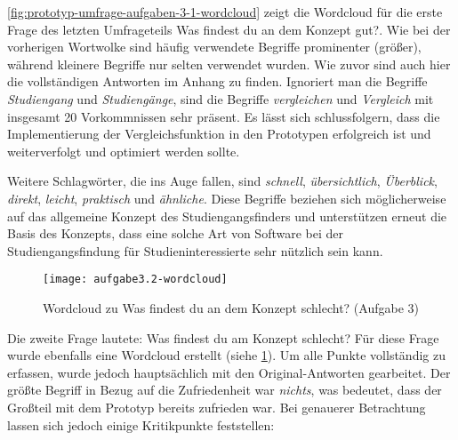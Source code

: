 \autoref{fig:prototyp-umfrage-aufgaben-3-1-wordcloud} zeigt die Wordcloud für die erste Frage des letzten Umfrageteils \glqq Was findest du an dem Konzept gut?\grqq{}. Wie bei der vorherigen Wortwolke sind häufig verwendete Begriffe prominenter (größer), während kleinere Begriffe nur selten verwendet wurden. Wie zuvor sind auch hier die vollständigen Antworten im Anhang zu finden. Ignoriert man die Begriffe \textit{Studiengang} und \textit{Studiengänge}, sind die Begriffe \textit{vergleichen} und \textit{Vergleich} mit insgesamt 20 Vorkommnissen sehr präsent. Es lässt sich schlussfolgern, dass die Implementierung der Vergleichsfunktion in den Prototypen erfolgreich ist und weiterverfolgt und optimiert werden sollte.

Weitere Schlagwörter, die ins Auge fallen, sind \textit{schnell}, \textit{übersichtlich}, \textit{Überblick}, \textit{direkt}, \textit{leicht}, \textit{praktisch} und \textit{ähnliche}. Diese Begriffe beziehen sich möglicherweise auf das allgemeine Konzept des Studiengangsfinders und unterstützen erneut die Basis des Konzepts, dass eine solche Art von Software bei der Studiengangsfindung für Studieninteressierte sehr nützlich sein kann.


\begin{figure}[H]
    \centering
    \texttt{[image: aufgabe3.2-wordcloud]}
    \caption{Wordcloud zu \glqq Was findest du an dem Konzept schlecht?\grqq{} (Aufgabe 3)}
    \label{fig:prototyp-umfrage-aufgaben-3-2-wordcloud}
\end{figure}

Die zweite Frage lautete: \glqq Was findest du am Konzept schlecht?\grqq{} Für diese Frage wurde ebenfalls eine Wordcloud erstellt (siehe \ref{fig:prototyp-umfrage-aufgaben-3-2-wordcloud}). Um alle Punkte vollständig zu erfassen, wurde jedoch hauptsächlich mit den Original-Antworten gearbeitet. Der größte Begriff in Bezug auf die Zufriedenheit war \textit{nichts}, was bedeutet, dass der Großteil mit dem Prototyp bereits zufrieden war. Bei genauerer Betrachtung lassen sich jedoch einige Kritikpunkte feststellen:

